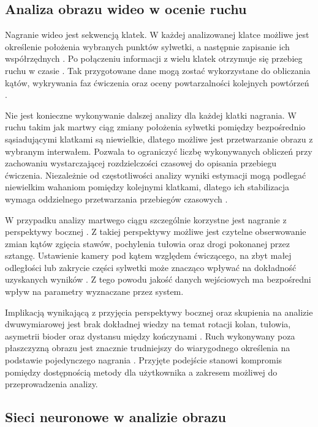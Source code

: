 \subsection{Analiza obrazu wideo w ocenie ruchu}

Nagranie wideo jest sekwencją klatek. W każdej analizowanej klatce możliwe jest określenie położenia wybranych punktów sylwetki, a następnie zapisanie ich współrzędnych \cite{mediapipe_pose_landmarker}. Po połączeniu informacji z wielu klatek otrzymuje się przebieg ruchu w czasie \cite{mundt2024twodimensional}. Tak przygotowane dane mogą zostać wykorzystane do obliczania kątów, wykrywania faz ćwiczenia oraz oceny powtarzalności kolejnych powtórzeń \cite{mundt2024twodimensional}.

Nie jest konieczne wykonywanie dalszej analizy dla każdej klatki nagrania. W ruchu takim jak martwy ciąg zmiany położenia sylwetki pomiędzy bezpośrednio sąsiadującymi klatkami są niewielkie, dlatego możliwe jest przetwarzanie obrazu z wybranym interwałem. Pozwala to ograniczyć liczbę wykonywanych obliczeń przy zachowaniu wystarczającej rozdzielczości czasowej do opisania przebiegu ćwiczenia. Niezależnie od częstotliwości analizy wyniki estymacji mogą podlegać niewielkim wahaniom pomiędzy kolejnymi klatkami, dlatego ich stabilizacja wymaga oddzielnego przetwarzania przebiegów czasowych \cite{wade2022markerless}.

W przypadku analizy martwego ciągu szczególnie korzystne jest nagranie z perspektywy bocznej \cite{hanen2025deadlift,wade2022markerless}. Z takiej perspektywy możliwe jest czytelne obserwowanie zmian kątów zgięcia stawów, pochylenia tułowia oraz drogi pokonanej przez sztangę. Ustawienie kamery pod kątem względem ćwiczącego, na zbyt małej odległości lub zakrycie części sylwetki może znacząco wpływać na dokładność uzyskanych wyników \cite{wade2022markerless}. Z tego powodu jakość danych wejściowych ma bezpośredni wpływ na parametry wyznaczane przez system.

Implikacją wynikającą z przyjęcia perspektywy bocznej oraz skupienia na analizie dwuwymiarowej jest brak dokładnej wiedzy na temat rotacji kolan, tułowia, asymetrii bioder oraz dystansu między kończynami \cite{wade2022markerless}. Ruch wykonywany poza płaszczyzną obrazu jest znacznie trudniejszy do wiarygodnego określenia na podstawie pojedynczego nagrania \cite{wade2022markerless}. Przyjęte podejście stanowi kompromis pomiędzy dostępnością metody dla użytkownika a zakresem możliwej do przeprowadzenia analizy.

\subsection{Sieci neuronowe w analizie obrazu}

